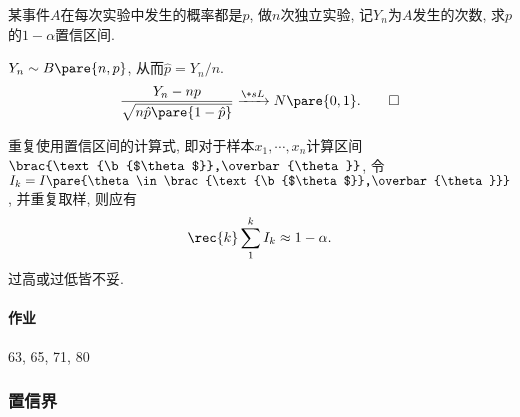 \documentclass{ctexart}
\newcommand{\ubar}[1]{\text{\b{$#1$}}}
\begin{document}
\begin{sample}
    \begin{ex}
        某事件$A$在每次实验中发生的概率都是$p$, 做$n$次独立实验, 记$Y_n$为$A$发生的次数, 求$p$的$1-\alpha$置信区间.
    \end{ex}
    \begin{solution}
        $Y_n\sim B\pare{n,p}$, 从而$\hat p = Y_n/n$. \\ 
        \[ \frac{Y_n - np}{\sqrt{n\hat{p}\pare{1-\hat{p}}}} \xrightarrow{\+sL} N\pare{0,1}. \qedhere \]
    \end{solution}
\end{sample}

\begin{remark}
    重复使用置信区间的计算式, 即对于样本$x_1,\cdots,x_n$计算区间$\brac{\ubar{\theta},\overbar{\theta}}$, 令$I_k = I\pare{\theta\in\brac{\ubar{\theta},\overbar{\theta}}}$, 并重复取样, 则应有
    \[ \rec{k} \sum_1^k I_k \approx 1-\alpha. \]
    过高或过低皆不妥.
\end{remark}

\paragraph{作业} %
\label{par:作业}

63, 65, 71, 80



\subsubsection{置信界} %
\label{ssub:置信界}
\end{document}
